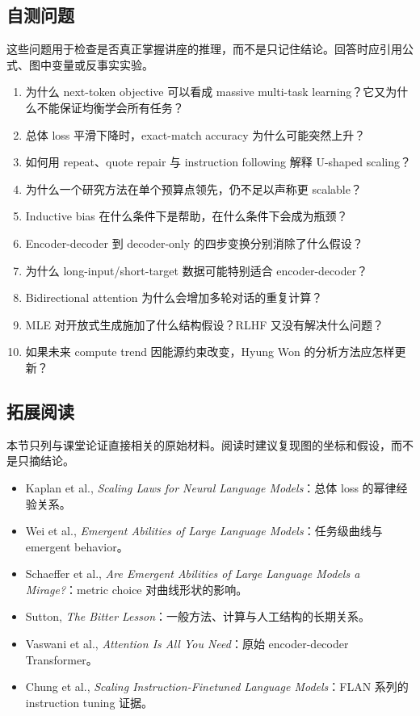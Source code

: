 \subsection{自测问题}

这些问题用于检查是否真正掌握讲座的推理，而不是只记住结论。回答时应引用公式、图中变量或反事实实验。

\begin{enumerate}
  \item 为什么 next-token objective 可以看成 massive multi-task learning？它又为什么不能保证均衡学会所有任务？
  \item 总体 loss 平滑下降时，exact-match accuracy 为什么可能突然上升？
  \item 如何用 repeat、quote repair 与 instruction following 解释 U-shaped scaling？
  \item 为什么一个研究方法在单个预算点领先，仍不足以声称更 scalable？
  \item Inductive bias 在什么条件下是帮助，在什么条件下会成为瓶颈？
  \item Encoder-decoder 到 decoder-only 的四步变换分别消除了什么假设？
  \item 为什么 long-input/short-target 数据可能特别适合 encoder-decoder？
  \item Bidirectional attention 为什么会增加多轮对话的重复计算？
  \item MLE 对开放式生成施加了什么结构假设？RLHF 又没有解决什么问题？
  \item 如果未来 compute trend 因能源约束改变，Hyung Won 的分析方法应怎样更新？
\end{enumerate}

\subsection{拓展阅读}

本节只列与课堂论证直接相关的原始材料。阅读时建议复现图的坐标和假设，而不是只摘结论。

\begin{itemize}
  \item Kaplan et al., \emph{Scaling Laws for Neural Language Models}：总体 loss 的幂律经验关系。
  \item Wei et al., \emph{Emergent Abilities of Large Language Models}：任务级曲线与 emergent behavior。
  \item Schaeffer et al., \emph{Are Emergent Abilities of Large Language Models a Mirage?}：metric choice 对曲线形状的影响。
  \item Sutton, \emph{The Bitter Lesson}：一般方法、计算与人工结构的长期关系。
  \item Vaswani et al., \emph{Attention Is All You Need}：原始 encoder-decoder Transformer。
  \item Chung et al., \emph{Scaling Instruction-Finetuned Language Models}：FLAN 系列的 instruction tuning 证据。
\end{itemize}


